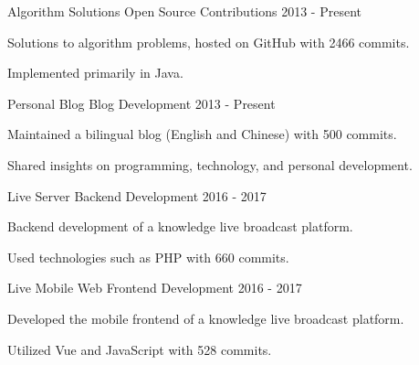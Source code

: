 

\begin{cventries}

  \cventry
    {Algorithm Solutions} %
    {Open Source Contributions} %
    {} %
    {2013 - Present} %
    {
      \begin{cvitems}
        \item {Solutions to algorithm problems, hosted on GitHub with 2466 commits.}
        \item {Implemented primarily in Java.}
      \end{cvitems}
    }

  \cventry
    {Personal Blog} %
    {Blog Development} %
    {} %
    {2013 - Present} %
    {
      \begin{cvitems}
        \item {Maintained a bilingual blog (English and Chinese) with 500 commits.}
        \item {Shared insights on programming, technology, and personal development.}
      \end{cvitems}
    }

  \cventry
    {Live Server} %
    {Backend Development} %
    {} %
    {2016 - 2017} %
    {
      \begin{cvitems}
        \item {Backend development of a knowledge live broadcast platform.}
        \item {Used technologies such as PHP with 660 commits.}
      \end{cvitems}
    }

  \cventry
    {Live Mobile Web} %
    {Frontend Development} %
    {} %
    {2016 - 2017} %
    {
      \begin{cvitems}
        \item {Developed the mobile frontend of a knowledge live broadcast platform.}
        \item {Utilized Vue and JavaScript with 528 commits.}
      \end{cvitems}
    }


\end{cventries}
